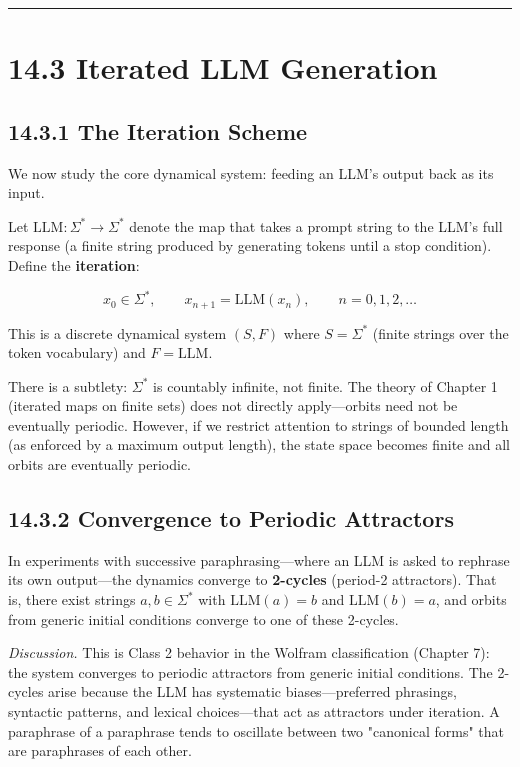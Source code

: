 \bigskip\hrule\bigskip

\section{14.3 Iterated LLM Generation}

\subsection{14.3.1 The Iteration Scheme}

We now study the core dynamical system: feeding an LLM's output back as its input.

\begin{definition}
Let $\mathrm{LLM}: \Sigma^* \to \Sigma^*$ denote the map that takes a prompt string to the LLM's full response (a finite string produced by generating tokens until a stop condition). Define the \textbf{iteration}:

\[
x_0 \in \Sigma^*, \qquad x_{n+1} = \mathrm{LLM}(x_n), \qquad n = 0, 1, 2, \ldots
\]

This is a discrete dynamical system $(S, F)$ where $S = \Sigma^*$ (finite strings over the token vocabulary) and $F = \mathrm{LLM}$.
\end{definition}

\begin{remark}
There is a subtlety: $\Sigma^*$ is countably infinite, not finite. The theory of Chapter 1 (iterated maps on finite sets) does not directly apply---orbits need not be eventually periodic. However, if we restrict attention to strings of bounded length (as enforced by a maximum output length), the state space becomes finite and all orbits are eventually periodic.
\end{remark}

\subsection{14.3.2 Convergence to Periodic Attractors}

\begin{theorem}[Wang et al., 2025]
In experiments with successive paraphrasing---where an LLM is asked to rephrase its own output---the dynamics converge to \textbf{2-cycles} (period-2 attractors). That is, there exist strings $a, b \in \Sigma^*$ with $\mathrm{LLM}(a) = b$ and $\mathrm{LLM}(b) = a$, and orbits from generic initial conditions converge to one of these 2-cycles.

\textit{Discussion.} This is Class 2 behavior in the Wolfram classification (Chapter 7): the system converges to periodic attractors from generic initial conditions. The 2-cycles arise because the LLM has systematic biases---preferred phrasings, syntactic patterns, and lexical choices---that act as attractors under iteration. A paraphrase of a paraphrase tends to oscillate between two "canonical forms" that are paraphrases of each other.
\end{theorem}

